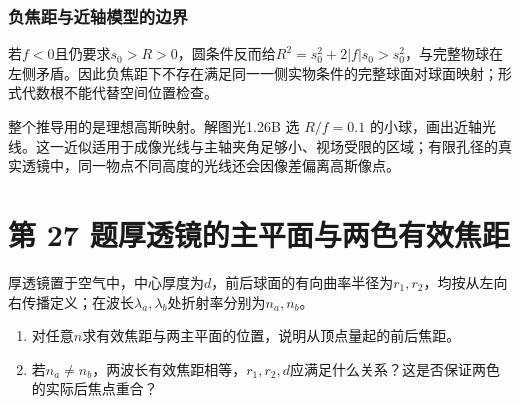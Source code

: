 \documentclass[UTF8,fontset=fandol,a4paper,11pt]{ctexart}
\begin{document}
\subsubsection*{负焦距与近轴模型的边界}
若$f<0$且仍要求$s_0>R>0$，圆条件反而给$R^2=s_0^2+2|f|s_0>s_0^2$，与完整物球在左侧矛盾。因此负焦距下不存在满足同一一侧实物条件的完整球面对球面映射；形式代数根不能代替空间位置检查。

整个推导用的是理想高斯映射。解图光1.26B 选 $R/f=0.1$ 的小球，画出近轴光线。这一近似适用于成像光线与主轴夹角足够小、视场受限的区域；有限孔径的真实透镜中，同一物点不同高度的光线还会因像差偏离高斯像点。




\section*{第 27 题\quad 厚透镜的主平面与两色有效焦距}\label{q:27}

厚透镜置于空气中，中心厚度为$d$，前后球面的有向曲率半径为$r_1,r_2$，均按从左向右传播定义；在波长$\lambda_a,\lambda_b$处折射率分别为$n_a,n_b$。
\begin{enumerate}
\item 对任意$n$求有效焦距与两主平面的位置，说明从顶点量起的前后焦距。
\item 若$n_a\ne n_b$，两波长有效焦距相等，$r_1,r_2,d$应满足什么关系？这是否保证两色的实际后焦点重合？
\end{enumerate}
\end{document}

